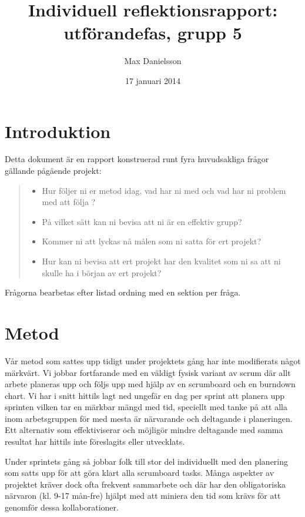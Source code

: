 \documentclass[a4paper]{report}
\title{Individuell reflektionsrapport: utförandefas, grupp 5}
\author{Max Danielsson}
\date{17 januari 2014}
\begin{document}
   \maketitle

\section*{Introduktion}

Detta dokument är en rapport konstruerad runt fyra huvudsakliga frågor gällande pågående projekt:

\begin{quote}
    \begin{itemize}
        \item Hur följer ni er metod idag, vad har ni med och vad har ni problem med att följa ?
        \item På vilket sätt kan ni bevisa att ni är en effektiv grupp?
        \item Kommer ni att lyckas nå målen som ni satta för ert projekt?
        \item Hur kan ni bevisa att ert projekt har den kvalitet som ni sa att ni skulle ha i början av ert projekt?
    \end{itemize}
\end{quote}

Frågorna bearbetas efter listad ordning med en sektion per fråga.

\section*{Metod}

Vår metod som sattes upp tidigt under projektets gång har inte modifierats
något märkvärt. Vi jobbar fortfarande med en väldigt fysisk variant av scrum
där allt arbete planeras upp och följs upp med hjälp av en scrumboard och en
burndown chart. Vi har i snitt hittils lagt ned ungefär en dag per sprint att
planera upp sprinten vilken tar en märkbar mängd med tid, speciellt med tanke
på att alla inom arbetsgruppen för med mesta är närvarande och deltagande i
planeringen. Ett alternativ som effektiviserar och möjligör mindre deltagande
med samma resultat har hittils inte föreslagits eller utvecklats.

Under sprintets gång så jobbar folk till stor del individuellt med den
planering som satts upp för att göra klart alla scrumboard tasks. Många
aspekter av projektet kräver dock ofta frekvent sammarbete och där har den
obligatoriska närvaron (kl. 9-17 mån-fre) hjälpt med att miniera den tid som
krävs för att genomför dessa kollaborationer.
\end{document}
